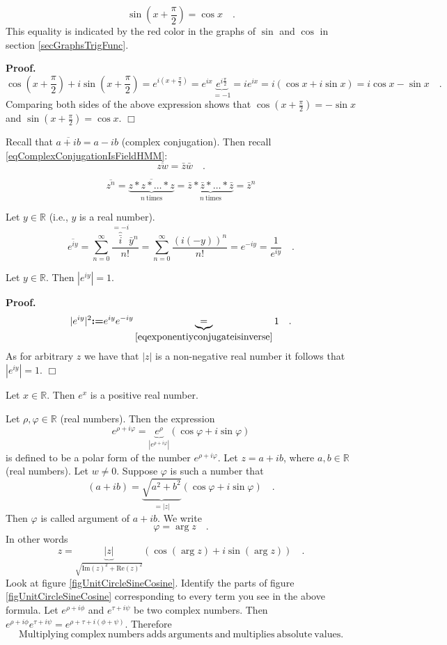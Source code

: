 \documentclass[12pt]{book}
\renewcommand{\Im}{\mathrm{Im}}
\renewcommand{\Re}{\mathrm{Re}}
\newcommand{\eqdef}{\textbf{:=}}
\newcommand{\importantFormula}[1]{\begin{equation} \boxed{#1} \end{equation}}
\newenvironment{proof}[1][]{ \textbf{Proof#1.} }{$\Box$\medskip}
\begin{document}
\[
\sin \left(x+\frac{\pi}{2}\right)= \cos x \quad .
\]
This equality is indicated by the red color in the graphs of $\sin$ and $\cos$ in section \ref{secGraphsTrigFunc}. 

\begin{proof}
\[
\cos(x+\frac{\pi}{2})+ i\sin (x+\frac{\pi}2)=e^{i(x+\frac{\pi}{2})}= e^{ix} \underbrace{e^{ i\frac{\pi}2 }}_{=-1}= ie^{ix}= i(\cos x + i \sin x)= i\cos x- \sin x\quad .
\]
Comparing both sides of the above expression shows that $\cos(x+\frac{\pi}{2})=-\sin x$ and $\sin(x+\frac{\pi}{2})= \cos x$.
\end{proof}

Recall that $\overline{a+ib}=a-ib$  (complex conjugation). Then recall \eqref{eqComplexConjugationIsFieldHMM}:
\[
\overline {z w}= \bar z \bar w\quad .
\]

\[
\overline {z^n}= \overline {\underbrace{z*z*\dots*z}_{n\mathrm{~times}}} = \underbrace{\bar z* \bar z *\dots * \bar z}_{n\mathrm{~times}}= \bar {z}^n
\]


Let $y\in \mathbb R$ (i.e., $y$ is a real number).
\begin{equation}\label{eqexponentiyconjugateisinverse}
\overline {e^{iy}}= \sum_{n=0}^\infty \frac{\overbrace{\bar i}^{=-i} \bar y^n}{n!}= \sum_{n=0}^\infty \frac{(i(-y))^n}{n!}=  e^{-iy}= \frac{1}{e^{iy}}\quad .
\end{equation}

Let $y\in \mathbb R$. Then $|e^{iy}|=1$. 

\begin{proof}
\[
|e^{iy}|^2 \eqdef e^{iy}e^{-iy}\underbrace{=}_{\eqref{eqexponentiyconjugateisinverse}}1 \quad .
\]
As for arbitrary $z$ we have that $|z|$ is a non-negative real number it follows that $|e^{iy}|=1$. 
\end{proof}

Let $x\in \mathbb R$. Then $e^x$ is a positive real number.

Let $\rho, \varphi\in \mathbb R$ (real numbers). Then the expression
\[e^{\rho+i\varphi}=\underbrace{e^{\rho}}_{|e^{\rho+i\varphi}|}(\cos \varphi + i\sin \varphi)
\]
is defined to be a polar form of the number $e^{\rho+i\varphi}$. Let $z=a+ib$, where $a, b\in \mathbb R$ (real numbers). Let $w\neq 0$. Suppose $\varphi$ is such a number that
\[
(a+ib)= \underbrace{\sqrt{a^2+b^2}}_{=|z|}(\cos \varphi + i \sin \varphi)\quad. 
\]
Then $\varphi$ is called argument of $a+ib$. We write \[\varphi=\arg z\quad .\] In other words
\[z=\underbrace{|z|}_{\sqrt{\Im(z)^2+\Re(z)^2}}\left(\cos(\arg z) + i\sin (\arg z)\right)\quad .
\]
Look at figure \ref{figUnitCircleSineCosine}. Identify the parts of figure \ref{figUnitCircleSineCosine} corresponding to every term you see in the above formula.
Let $e^{\rho+i\phi}$ and $e^{\tau+i\psi}$ be two complex numbers. Then $e^{\rho+i\phi}e^{\tau+i\psi} = e^{\rho+\tau+i(\phi+\psi)}$. Therefore 
\importantFormula{
\mathrm{Multiplying~complex~numbers~adds~arguments~and~multiplies~absolute~values.}
}
\end{document}

